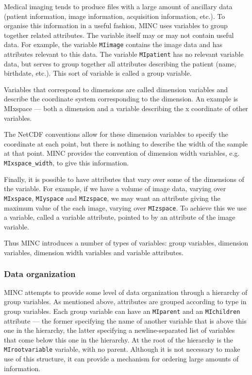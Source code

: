Medical imaging tends to produce files with a large amount of
ancillary data (patient information, image information, acquisition
information, etc.). To organise this information in a useful fashion,
MINC uses variables to group together related attributes. The variable
itself may or may not contain useful data. For example, the variable
\verb+MIimage+ contains the image data and has attributes relevant to this
data. The variable \verb+MIpatient+ has no relevant variable data, but
serves to group together all attributes describing the patient (name,
birthdate, etc.). This sort of variable is called a group variable.

Variables that correspond to dimensions are called dimension variables
and describe the coordinate system corresponding to the dimension. An
example is MIxspace --- both a dimension and a variable describing the
x coordinate of other variables.

The NetCDF conventions allow for these dimension variables to specify
the coordinate at each point, but there is nothing to describe the
width of the sample at that point. MINC provides the convention of
dimension width variables, e.g. \verb+MIxspace_width+, to give this
information.

Finally, it is possible to have attributes that vary over some of the
dimensions of the variable. For example, if we have a volume of image
data, varying over \verb+MIxspace+, \verb+MIyspace+ and
\verb+MIzspace+, we may want an attribute giving the maximum value of
the each image, varying over \verb+MIzspace+. To achieve this we use a
variable, called a variable attribute, pointed to by an attribute of
the image variable.

Thus MINC introduces a number of types of variables: group variables,
dimension variables, dimension width variables and variable
attributes.

\subsubsection{Data organization}

MINC attempts to provide some level of data organization through a
hierarchy of group variables. As mentioned above, attributes are
grouped according to type in group variables. Each group variable can
have an \verb+MIparent+ and an \verb+MIchildren+ attribute --- the
former specifying the name of another variable that is above this one
in the hierarchy, the latter specifying a newline-separated list of
variables that come below this one in the hierarchy. At the root of
the hierarchy is the \verb+MIrootvariable+ variable, with no parent.
Although it is not necessary to make use of this structure, it can
provide a mechanism for ordering large amounts of information.

